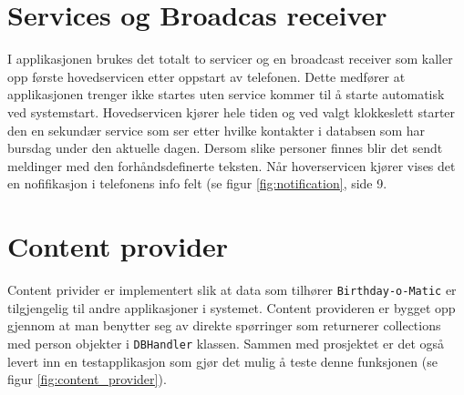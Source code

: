 \section{Services og Broadcas receiver}
I applikasjonen brukes det totalt to servicer og en broadcast receiver som kaller opp første hovedservicen etter oppstart av telefonen. Dette medfører at applikasjonen trenger ikke startes uten service kommer til å starte automatisk ved systemstart. Hovedservicen kjører hele tiden og ved valgt klokkeslett starter den en sekundær service som ser etter hvilke kontakter i databsen som har bursdag under den aktuelle dagen. Dersom slike personer finnes blir det sendt meldinger med den forhåndsdefinerte teksten. 
Når hoverservicen kjører vises det en nofifikasjon i telefonens info felt (se figur \ref{fig:notification}, side \pageref{fig:notification}9.

\section{Content provider}
Content privider er implementert slik at data som tilhører \texttt{Birthday-o-Matic} er tilgjengelig til andre applikasjoner i systemet. Content provideren er bygget opp gjennom at man benytter seg av direkte spørringer som returnerer collections med person objekter i \texttt{DBHandler} klassen. Sammen med prosjektet er det også levert inn en testapplikasjon som gjør det mulig å teste denne funksjonen (se figur \ref{fig:content_provider}).

